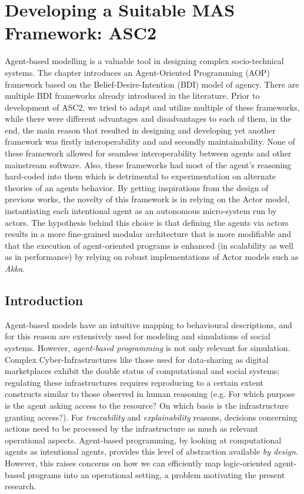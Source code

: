 


\chapter{Developing a Suitable MAS Framework: ASC2}
Agent-based modelling is a valuable tool in designing complex socio-technical systems. The chapter introduces an Agent-Oriented Programming (AOP) framework based on the Belief-Desire-Intention (BDI) model of agency. There are multiple BDI frameworks already introduced in the literature. Prior to development of ASC2, we tried to adapt and utilize multiple of these frameworks, while there were different advantages and disadvantages to each of them, in the end, the main reason that resulted in designing and developing yet another framework was firstly interoperability and and secondly maintainability. None of these framework allowed for seamless interoperability between agents and other mainstream software. Also, these frameworks had most of the agent's reasoning hard-coded into them which is detrimental to experimentation on alternate theories of an agents behavior. By getting inspirations from the design of previous works, the novelty of this framework is in relying on the Actor model, instantiating each intentional agent as an autonomous micro-system run by actors. The hypothesis behind this choice is that defining the agents via actors results in a more fine-grained modular architecture that is more modifiable and that the execution of agent-oriented programs is enhanced (in scalability as well as in performance) by relying on robust implementations of Actor models such as \textit{Akka}.


\section{Introduction}
Agent-based models have an intuitive mapping to behavioural descriptions, and for this reason are extensively used for modeling and simulations of social systems. However, \textit{agent-based programming} is not only relevant for simulation. Complex Cyber-Infrastructures like those used for data-sharing as digital marketplaces exhibit the double status of computational and social systems; regulating these infrastructures requires reproducing to a certain extent constructs similar to those observed in human reasoning (e.g. For which purpose is the agent asking access to the resource? On which basis is the infrastructure granting access?). For \textit{traceability} and \textit{explainability} reasons, decisions concerning actions need to be processed by the infrastructure as much as relevant operational aspects. Agent-based programming, by looking at computational agents as intentional agents, provides this level of abstraction available \textit{by design}. However, this raises concerns on how we can efficiently map logic-oriented agent-based programs into an operational setting, a problem motivating the present research.


